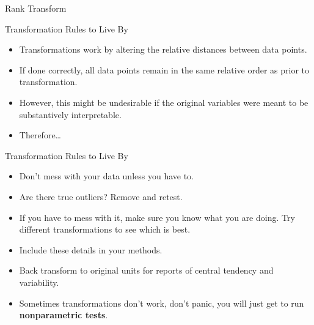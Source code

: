 \documentclass[
  ignorenonframetext,
]{beamer}
\providecommand{\tightlist}{%
  \setlength{\itemsep}{0pt}\setlength{\parskip}{0pt}}
\begin{document}
\begin{frame}{Rank Transform}
\label{rank-transform}
\end{frame}

\begin{frame}{Transformation Rules to Live By}
\label{transformation-rules-to-live-by}
\begin{itemize}
\item
  Transformations work by altering the relative distances between data
  points.
\item
  If done correctly, all data points remain in the same relative order
  as prior to transformation.
\item
  However, this might be undesirable if the original variables were
  meant to be substantively interpretable.
\item
  Therefore\ldots{}
\end{itemize}
\end{frame}

\begin{frame}{Transformation Rules to Live By}
\label{transformation-rules-to-live-by-1}
\begin{itemize}
\tightlist
\item
  Don't mess with your data unless you have to.
\end{itemize}

\begin{itemize}
\tightlist
\item
  Are there true outliers? Remove and retest.
\end{itemize}

\begin{itemize}
\tightlist
\item
  If you have to mess with it, make sure you know what you are doing.
  Try different transformations to see which is best.
\end{itemize}

\begin{itemize}
\tightlist
\item
  Include these details in your methods.
\end{itemize}

\begin{itemize}
\tightlist
\item
  Back transform to original units for reports of central tendency and
  variability.
\end{itemize}

\begin{itemize}
\tightlist
\item
  Sometimes transformations don't work, don't panic, you will just get
  to run \textbf{nonparametric tests}.
\end{itemize}
\end{frame}
\end{document}
